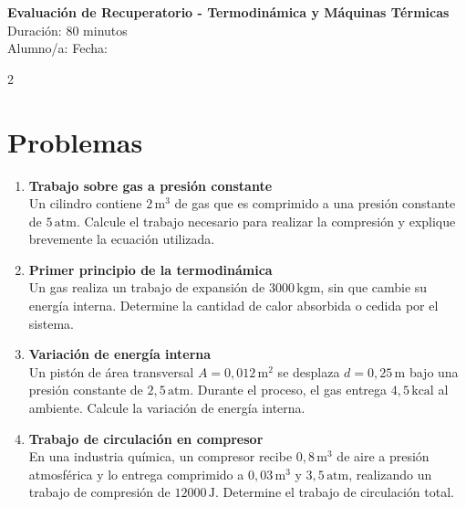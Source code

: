 \documentclass[a4paper,12pt]{article}
\begin{document}
\begin{center}
    \Large \textbf{Evaluación de Recuperatorio - Termodinámica y Máquinas Térmicas} \\
    \normalsize Duración: 80 minutos \\
    Alumno/a: \underline{\hspace{6cm}} \hspace{0.5cm} Fecha: \underline{\hspace{2cm}}
\end{center}

\vspace{0.3cm}

\begin{multicols}{2}

\section*{Problemas}

\begin{enumerate}

\item \textbf{Trabajo sobre gas a presión constante} \\
Un cilindro contiene $2\,\text{m}^3$ de gas que es comprimido a una presión constante de $5\,\text{atm}$. Calcule el trabajo necesario para realizar la compresión y explique brevemente la ecuación utilizada.

\vspace{0.3cm}

\item \textbf{Primer principio de la termodinámica} \\
Un gas realiza un trabajo de expansión de $3000\,\text{kgm}$, sin que cambie su energía interna. Determine la cantidad de calor absorbida o cedida por el sistema.

\vspace{0.3cm}

\item \textbf{Variación de energía interna} \\
Un pistón de área transversal $A = 0{,}012\,\text{m}^2$ se desplaza $d = 0{,}25\,\text{m}$ bajo una presión constante de $2{,}5\,\text{atm}$. Durante el proceso, el gas entrega $4{,}5\,\text{kcal}$ al ambiente. Calcule la variación de energía interna.

\vspace{0.3cm}

\item \textbf{Trabajo de circulación en compresor} \\
En una industria química, un compresor recibe $0{,}8\,\text{m}^3$ de aire a presión atmosférica y lo entrega comprimido a $0{,}03\,\text{m}^3$ y $3{,}5\,\text{atm}$, realizando un trabajo de compresión de $12000\,\text{J}$. Determine el trabajo de circulación total.


\end{enumerate}
\end{multicols}
\end{document}
